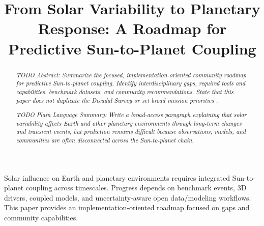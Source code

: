 \documentclass[
  draft
]{agujournal2025}
\begin{document}

\title{From Solar Variability to Planetary Response: A Roadmap for Predictive Sun-to-Planet Coupling}





\keypoints%
{Solar influence on Earth and planetary environments requires integrated Sun-to-planet coupling across timescales.}
{Progress depends on benchmark events, 3D drivers, coupled models, and uncertainty-aware open data/modeling workflows.}
{This paper provides an implementation-oriented roadmap focused on gaps and community capabilities.}

\maketitle

\begin{abstract}
\textit{TODO Abstract: Summarize the focused, implementation-oriented community roadmap for predictive Sun-to-planet coupling. Identify interdisciplinary gaps, required tools and capabilities, benchmark datasets, and community recommendations. State that this paper does not duplicate the Decadal Survey or set broad mission priorities \cite{placeholder-roadmap,placeholder-decadal}.}

\begin{plainlanguagesummary}
\textit{TODO Plain Language Summary: Write a broad-access paragraph explaining that solar variability affects Earth and other planetary environments through long-term changes and transient events, but prediction remains difficult because observations, models, and communities are often disconnected across the Sun-to-planet chain.}
\end{plainlanguagesummary}
\end{abstract}

\end{document}

